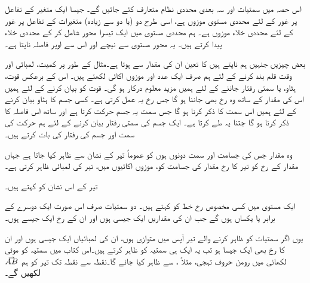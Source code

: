اس حصہ میں سمتیات اور سہ بعدی محددی نظام متعارف کئے جائیں گے۔ جیسا ایک متغیر کے تفاعل پر غور کے لئے محددی مستوی موزوں ہے، اسی طرح دو (یا دو سے زیادہ) متغیرات کے تفاعل پر غور کے لئے محددی خلاء موزوں ہے۔ ہم محددی مستوی میں ایک تیسرا محور شامل کر کے محددی خلاء پیدا کرتے ہیں۔ یہ محور  مستوی سے نیچے اور اس سے اوپر فاصلہ ناپتا ہے۔

بعض چیزیں جنہیں ہم ناپتے ہیں کا تعین ان کی مقدار سے ہوتا ہے۔مثال کے طور پر کمیت، لمبائی اور وقت قلم بند کرنے کے لئے  ہم صرف ایک عدد اور موزوں اکائی لکھتے ہیں۔ اس کے برعکس قوت، ہٹاو، یا سمتی رفتار جاننے کے لئے ہمیں مزید معلوم درکار ہو گی۔ قوت کو بیان کرنے کے لئے ہمیں اس کی مقدار کے ساتھ وہ رخ بھی جاننا ہو گا جس رخ یہ عمل کرتی ہے۔ کسی جسم کا ہٹاو بیان کرنے کے لئے ہمیں اس سمت کا ذکر کرنا ہو گا جس سمت یہ جسم حرکت کرتا ہے اور ساتھ اس فاصلہ کا ذکر کرنا ہو گا جتنا یہ طے کرتا ہے۔ ایک جسم کی سمتی رفتار بیان کرنے کے لئے ہم حرکت کی سمت اور جسم کی رفتار کی بات کرتے ہیں۔

وہ مقدار جس کی جسامت اور سمت دونوں ہوں کو عموماً تیر کے نشان سے ظاہر کیا جاتا ہے جہاں مقدار کے رخ کو  تیر کا رخ  مقدار  کی جسامت کو، موزوں اکائیوں میں، تیر کی لمبائی ظاہر کرتی ہے۔

تیر کے اس نشان کو  کہتے ہیں۔

ایک مستوی میں کسی مخصوص رخ خط کو  کہتے ہیں۔ دو سمتیات صرف اس صورت ایک دوسرے کے برابر یا یکساں ہوں گے جب ان کی مقداریں ایک جیسی ہوں اور ان کے رخ ایک جیسے ہوں۔

یوں اگر سمتیات کو ظاہر کرنے والے تیر  آپس میں متوازی ہوں، ان کی لمبائیاں ایک جیسی ہوں اور ان کا رخ بھی ایک جیسا ہو تب یہ ایک ہی  سمتیہ کو ظاہر کرتے ہیں۔اس  کتاب میں سمتیہ کو موٹی لکھائی میں رومن حروف تہجی، مثلاً   ،  سے ظاہر کیا جائے گا۔نقطہ  سے نقطہ  تک تیر کو ہم 
$\krightharpoonup{AB}$
 لکھیں گے۔

